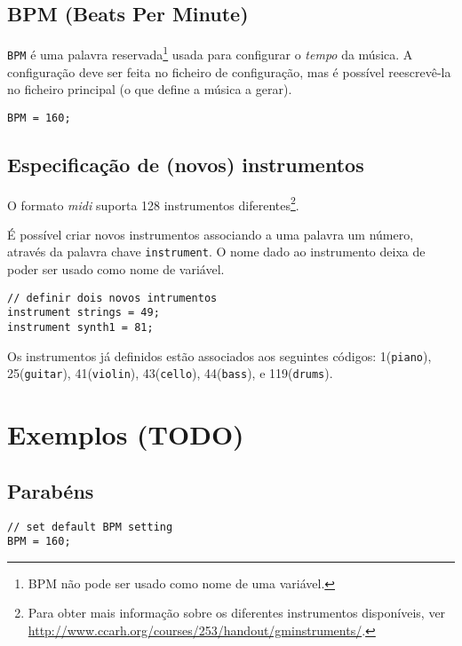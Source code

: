 \documentclass{article}
\begin{document}
\subsection{BPM (Beats Per Minute)}
\texttt{BPM} é uma palavra reservada\footnote{BPM não pode ser usado como nome de uma variável.} usada para configurar o \textit{tempo} da música. A configuração deve ser feita no ficheiro de configuração, mas é possível reescrevê-la no ficheiro principal (o que define a música a gerar).
\begin{lstlisting} 
BPM = 160;
\end{lstlisting}

\subsection{Especificação de (novos) instrumentos}
O formato \textit{midi} suporta 128 instrumentos diferentes\footnote{Para obter mais informação sobre os diferentes instrumentos disponíveis, ver \url{http://www.ccarh.org/courses/253/handout/gminstruments/}.}.

É possível criar novos instrumentos associando a uma palavra um número, através da palavra chave \texttt{instrument}. O nome dado ao instrumento deixa de poder ser usado como nome de variável.

\begin{lstlisting} 
// definir dois novos intrumentos
instrument strings = 49;
instrument synth1 = 81;
\end{lstlisting}

Os instrumentos já definidos estão associados aos seguintes códigos: 1(\texttt{piano}), 25(\texttt{guitar}), 41(\texttt{violin}), 43(\texttt{cello}), 44(\texttt{bass}), e 119(\texttt{drums}). 



\section{Exemplos (TODO)} \label{example}
\subsection{Parabéns}
\begin{lstlisting}[caption=parabens.auxiliar]
// set default BPM setting
BPM = 160;
\end{lstlisting}
\end{document}
